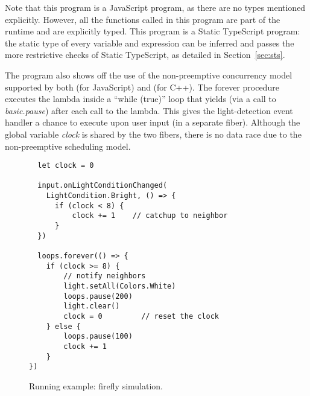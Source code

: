 Note that this program is a JavaScript program, as there are no
types mentioned explicitly. However, all the functions called in
this program are part of the runtime and are explicitly
typed. This program is a Static TypeScript program:
the static type of every variable and expression
can be inferred and passes the more restrictive checks
of Static TypeScript, as detailed in Section~\ref{sec:sts}.

The program also shows off the use of the non-preemptive concurrency
model supported by both \MC (for JavaScript) and \CO (for C++).
The forever procedure executes the lambda inside a ``while (true)''
loop that yields (via a call to \emph{basic.pause}) after each call to the lambda.
This gives the light-detection event handler a chance to execute
upon user input (in a separate fiber). Although the global variable \emph{clock} is
shared by the two fibers, there is no data race due to the non-preemptive
scheduling model.

\begin{figure}
\begin{lstlisting}
  let clock = 0

  input.onLightConditionChanged(
    LightCondition.Bright, () => {
      if (clock < 8) {
          clock += 1    // catchup to neighbor
      }
  })

  loops.forever(() => {
    if (clock >= 8) {
        // notify neighbors
        light.setAll(Colors.White)
        loops.pause(200)
        light.clear()
        clock = 0         // reset the clock
    } else {
        loops.pause(100)
        clock += 1
    }
})
\end{lstlisting}
\caption{\label{fig:example}Running example: firefly simulation.}
\end{figure}


